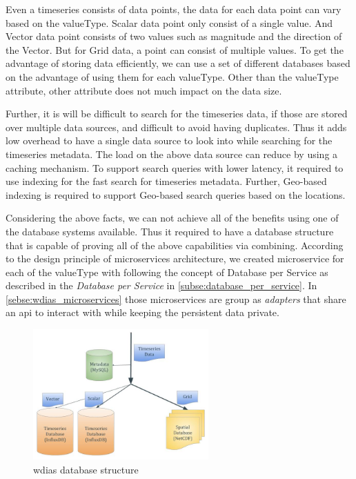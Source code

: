 Even a timeseries consists of data points, the data for each data point can vary based on the valueType. Scalar data point only consist of a single value. And Vector data point consists of two values such as magnitude and the direction of the Vector. But for Grid data, a point can consist of multiple values. To get the advantage of storing data efficiently, we can use a set of different databases based on the advantage of using them for each valueType. Other than the valueType attribute, other attribute does not much impact on the data size.

Further, it is will be difficult to search for the timeseries data, if those are stored over multiple data sources, and difficult to avoid having duplicates. Thus it adds low overhead to have a single data source to look into while searching for the timeseries metadata. The load on the above data source can reduce by using a caching mechanism. To support search queries with lower latency, it required to use indexing for the fast search for timeseries metadata. Further, Geo-based indexing is required to support Geo-based search queries based on the locations. 

Considering the above facts, we can not achieve all of the benefits using one of the database systems available. Thus it required to have a database structure that is capable of proving all of the above capabilities via combining. According to the design principle of microservices architecture, we created microservice for each of the valueType with following the concept of Database per Service as described in the \emph{Database per Service} in \cref{subse:database_per_service}. In \cref{sebse:wdias_microservices} those microservices are group as \emph{adapters} that share an \acrshort{api} to interact with while keeping the persistent data private.

\begin{figure}[htp]
    \centering
    \includegraphics[width=0.6\textwidth]{method/microservice/wdias_database_structure.jpg}
    \caption{\acrshort{wdias} database structure}
    \label{fi:database_structure}
\end{figure}

